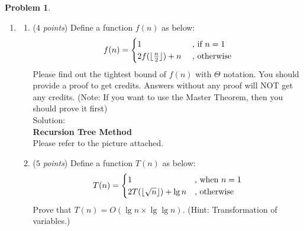 \documentclass[12pt,a4paper]{report}
\newcommand{\points}[1]{ ($#1$ \textit{points}) }
\theoremstyle{definition}
\newtheorem{problem}{\textbf{Problem}}
\newcommand\NoIndent[1]{
  \par\vbox{\parbox[t]{\linewidth}{#1}}
}
\newcommand{\solution}{\textbf{\NoIndent{Solution.}}}
\theoremstyle{definition}
\DeclarePairedDelimiter\floor{\lfloor}{\rfloor}
\begin{document}
\begin{problem}
\begin{enumerate}[label=\arabic*.]
\begin{enumerate}[label=\alph*.]
    \end{enumerate}
\item
    \begin{enumerate}[label=\alph*.]
    \item\points{4}Define a function $f(n)$ as below:
    \begin{equation*}
    f(n) = 
           \begin{cases}
           1 &\text{ , if } n = 1\\
           2f(\floor{\frac{n}{2}}) + n &\text{ , otherwise}
           \end{cases}
    \end{equation*}
Please find out the tightest bound of $f(n)$ with $\Theta$ notation.
You should provide a proof to get credits.
Answers without any proof will NOT get any credits.
(Note: If you want to use the Master Theorem, then you should prove it first)\\
    Solution:\\
    \textbf{Recursion Tree Method}\\
    Please refer to the picture attached.\\

    \item \points{5}Define a function $T(n)$ as below:
    \begin{equation*}
    T(n) = 
           \begin{cases}
           1 &\text{, when } n = 1\\
           2T(\floor{\sqrt{n}}) + \lg n &\text{, otherwise}
           \end{cases}
    \end{equation*}
Prove that $T(n) = O(\lg n \times \lg\lg n)$.
(Hint: Transformation of variables.)\\
    \end{enumerate}



\end{enumerate}


\end{problem}
\end{document}
